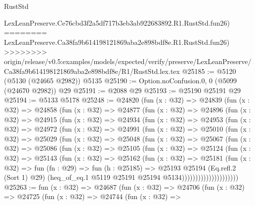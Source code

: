 \begin{lexlean}{RustStd}
\begin{coremodule}
{\begin{coremodule}
{{{{{{{{{{{{{{{{{{{{{{{{{{{{{{{    LexLeanPreserve.Ce76cbd3f2a5df717b3eb3ab922683892.R1.RustStd.fun26)
========
    LexLeanPreserve.Ca38fa9b614198121869aba2e898bdf8e.R1.RustStd.fun26)
>>>>>>>> origin/release/v0.5:examples/models/expected/verify/preserve/LexLeanPreserve/Ca38fa9b614198121869aba2e898bdf8e/R1/RustStd.lex.tex
@25185 := @5120 (@5130 (@24665 @2982)) @5135
@25190 := Option.noConfusion.{0, 0} (@5099 (@24670 @2982)) @29
@25191 := @2088 @29
@25193 := @25190 @25191 @29
@25194 := @5133 @5178
@25248 := @24820
    (fun (x : @32) =>
    @24839
      (fun (x : @32) =>
      @24858
        (fun (x : @32) =>
        @24877
          (fun (x : @32) =>
          @24896
            (fun (x : @32) =>
            @24915
              (fun (x : @32) =>
              @24934
                (fun (x : @32) =>
                @24953
                  (fun (x : @32) =>
                  @24972
                    (fun (x : @32) =>
                    @24991
                      (fun (x : @32) =>
                      @25010
                        (fun (x : @32) =>
                        @25029
                          (fun (x : @32) =>
                          @25048
                            (fun (x : @32) =>
                            @25067
                              (fun (x : @32) =>
                              @25086
                                (fun (x : @32) =>
                                @25105
                                  (fun (x : @32) =>
                                  @25124
                                    (fun (x : @32) =>
                                    @25143
                                      (fun (x : @32) =>
                                      @25162
                                        (fun (x : @32) =>
                                        @25181
                                          (fun (x : @32) =>
                                          fun (fn : @29) =>
                                          fun (h : @25185) =>
                                          @25193
                                            @25194
                                            (Eq.refl.{2} (Sort 1) @29)
                                            (heq_of_eq.{1}
                                              @5119
                                              @25191
                                              @25194
                                              @5134)))))))))))))))))))))
@25263 := fun (x : @32) =>
  @24687
    (fun (x : @32) =>
    @24706
      (fun (x : @32) =>
      @24725
        (fun (x : @32) =>
        @24744
          (fun (x : @32) =>
}}}}}}}}}}}}}}}}}}}}}}}}}}}}}}}
\end{coremodule}}
\end{coremodule}
\end{lexlean}
